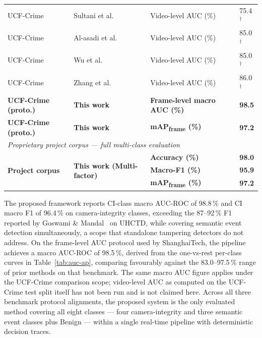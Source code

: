 \documentclass[sensors,article,submit,pdftex,moreauthors]{Definitions/mdpi}
\begin{document}
\begin{table}[H]
\begin{tabular}{p{2.8cm} p{3.4cm} p{3.2cm} p{2.4cm}}
UCF-Crime & Sultani et al.~\cite{sultani2018realworld} & Video-level AUC (\%) & 75.4$^\dagger$ \\
UCF-Crime & Al-asadi et al.~\cite{deepsta2024}         & Video-level AUC (\%) & 85.0$^\dagger$ \\
UCF-Crime & Wu et al.~\cite{wu2024vadclip}             & Video-level AUC (\%) & 85.0$^\dagger$ \\
UCF-Crime & Zhang et al.~\cite{zhang2024lagovad}       & Video-level AUC (\%) & 86.0$^\dagger$ \\
\textbf{UCF-Crime (proto.)} & \textbf{This work} & \textbf{Frame-level macro AUC (\%)} & \textbf{98.5} \\
\textbf{UCF-Crime (proto.)} & \textbf{This work} & \textbf{mAP\textsubscript{frame} (\%)} & \textbf{97.2} \\[5pt]
\multicolumn{4}{l}{\textit{Proprietary project corpus — full multi-class evaluation}} \\[2pt]
\multirow{3}{*}{\textbf{Project corpus}} & \multirow{3}{*}{\textbf{This work (Multi-factor)}} & \textbf{Accuracy (\%)}   & \textbf{98.0} \\
 &  & \textbf{Macro-F1 (\%)}   & \textbf{95.9} \\
 &  & \textbf{mAP\textsubscript{frame} (\%)} & \textbf{97.2} \\
\bottomrule
\end{tabular}
\end{table}
 
The proposed framework reports CI-class macro AUC-ROC of 98.8\,\% and CI macro F1 of 96.4\,\% on camera-integrity classes, exceeding the 87--92\,\% F1 reported by Goswami \& Mandal~\cite{goswami2023hybrid} on UHCTD, while covering semantic event detection simultaneously, a scope that standalone tampering detectors do not address. On the frame-level AUC protocol used by ShanghaiTech, the pipeline achieves a macro AUC-ROC of 98.5\,\%, derived from the one-vs-rest per-class curves in Table~\ref{tab:auc-ap}, comparing favourably against the 83.0--97.5\,\% range of prior methods on that benchmark. The same macro AUC figure applies under the UCF-Crime comparison scope; video-level AUC as computed on the UCF-Crime test split itself has not been run and is not claimed here. Across all three benchmark protocol alignments, the proposed system is the only evaluated method covering all eight classes — four camera-integrity and three semantic event classes plus Benign — within a single real-time pipeline with deterministic decision traces.
 
\end{document}
